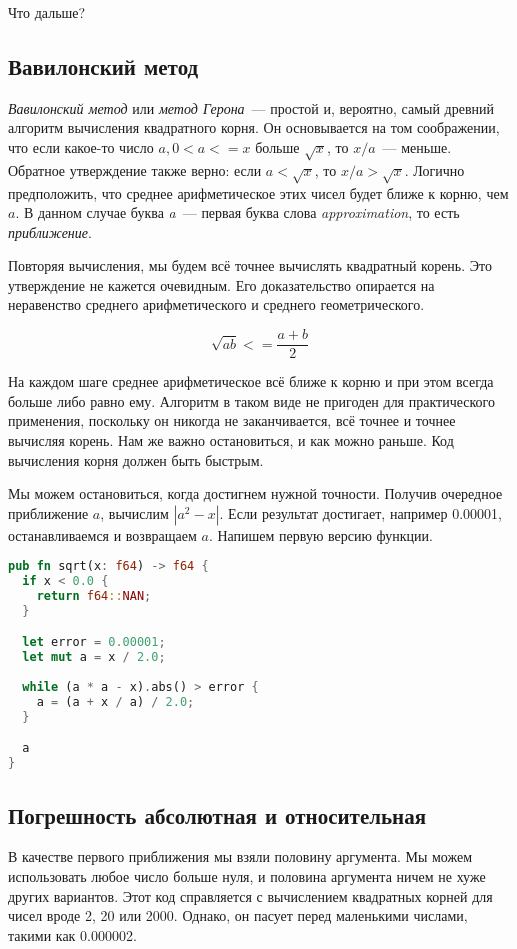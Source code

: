 Что дальше?

\subsection{Вавилонский метод}

{\em Вавилонский метод} или {\em метод Герона}~--- простой и, вероятно, самый древний алгоритм вычисления квадратного корня.
Он основывается на том соображении, что если какое-то число $a, 0 < a <= x$ больше $\sqrt x$, то $x/a$~--- меньше.
Обратное утверждение также верно: если $a < \sqrt x$, то $x/a > \sqrt x$.
Логично предположить, что среднее арифметическое этих чисел будет ближе к корню, чем $a$.
В данном случае буква {\em a}~--- первая буква слова {\em approximation}, то есть {\em приближение}.

Повторяя вычисления, мы будем всё точнее вычислять квадратный корень.
Это утверждение не кажется очевидным.
Его доказательство опирается на неравенство среднего арифметического и среднего геометрического.

$$
\sqrt {a b} <= \frac{a + b}{2}
$$

На каждом шаге среднее арифметическое всё ближе к корню и при этом всегда больше либо равно ему.
Алгоритм в таком виде не пригоден для практического применения, поскольку он никогда не заканчивается, всё точнее и точнее вычисляя корень.
Нам же важно остановиться, и как можно раньше.
Код вычисления корня должен быть быстрым.

Мы можем остановиться, когда достигнем нужной точности.
Получив очередное приближение $a$, вычислим $|a^2 - x|$.
Если результат достигает, например 0.00001, останавливаемся и возвращаем $a$.
Напишем первую версию функции.

\begin{lstlisting}[language=Rust]
pub fn sqrt(x: f64) -> f64 {
  if x < 0.0 {
    return f64::NAN;
  }

  let error = 0.00001;
  let mut a = x / 2.0;
  
  while (a * a - x).abs() > error {
    a = (a + x / a) / 2.0;
  }

  a
}
\end{lstlisting}

\subsection{Погрешность абсолютная и относительная}

В качестве первого приближения мы взяли половину аргумента.
Мы можем использовать любое число больше нуля, и половина аргумента ничем не хуже других вариантов.
Этот код справляется с вычислением квадратных корней для чисел вроде 2, 20 или 2000.
Однако, он пасует перед маленькими числами, такими как 0.000002.

